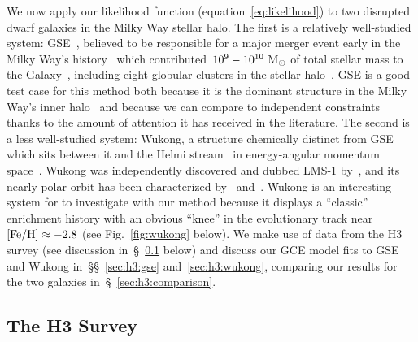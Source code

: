 \documentclass[ms.tex]{subfiles}
\begin{document}
We now apply our likelihood function (equation~\ref{eq:likelihood}) to two
disrupted dwarf galaxies in the Milky Way stellar halo.
The first is a relatively well-studied system: GSE~\citep{Belokurov2018,
Helmi2018}, believed to be responsible for a major merger event early in the
Milky Way's history~\citep{Chaplin2020} which contributed~$10^9 - 10^{10}~\text{M}_\odot$
of total stellar mass to the Galaxy~\citep{Deason2019, Fattahi2019,
Mackereth2019, Vincenzo2019}, including eight globular clusters in the stellar
halo~\citep{Myeong2018}.
GSE is a good test case for this method both because it is the dominant
structure in the Milky Way's inner halo~\citep{Helmi2018} and because we can
compare to independent constraints thanks to the amount of attention it has
received in the literature.
The second is a less well-studied system: Wukong, a structure chemically
distinct from GSE which sits between it and the Helmi stream~\citep{Helmi1999}
in energy-angular momentum space~\citep{Naidu2020, Naidu2022}.
Wukong was independently discovered and dubbed LMS-1 by~\citet{Yuan2020},
and its nearly polar orbit has been characterized by~\citet{Malhan2021,
Malhan2022} and~\citet{Shank2022}.
Wukong is an interesting system for to investigate with our method because it
displays a ``classic'' enrichment history with an obvious ``knee'' in the
evolutionary track near~$\text{[Fe/H]} \approx -2.8$ (see Fig.~\ref{fig:wukong} below).
We make use of data from the H3 survey (see discussion
in~\S~\ref{sec:h3:survey} below) and discuss our GCE model fits to GSE and
Wukong in~\S\S~\ref{sec:h3:gse} and~\ref{sec:h3:wukong}, comparing our results
for the two galaxies in~\S~\ref{sec:h3:comparison}.

\subsection{The H3 Survey}
\label{sec:h3:survey}
\end{document}

